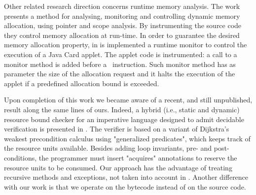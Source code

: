 Other related research direction concerns runtime memory analysis. The work \cite{GNYZ04pir} presents a method for analysing, monitoring and controlling dynamic memory allocation, using pointer and scope analysis. By instrumenting the source code they control memory allocation at run-time. In order to guarantee the desired memory allocation property, in \cite{fredlund04gcp} is implemented a runtime monitor to control the execution of a Java Card applet. The applet code is instrumented: a call to a monitor method is added before a \new\ instruction. Such monitor method has as parameter the size of the allocation request and it halts the execution of the applet if a predefined allocation bound is exceeded. 



Upon completion of this work we became aware of a recent, and still
unpublished, result along the same lines of ours. Indeed,  a hybrid (i.e., static and dynamic)
resource bound checker for an imperative language designed to admit
decidable verification is presented in \cite{CEILN05}. The verifier is based on a variant of Dijkstra's
weakest precondition calculus using "generalized predicates", which keeps
track of the resource units available. Besides adding loop invariants,
pre- and post-conditions, the programmer must insert "acquires"
annotations to reserve the resource units to be consumed. Our approach has
the advantage of treating recursive methods and exceptions, not taken into
account in \cite{CEILN05}. Another difference with our work is that we
operate on the bytecode instead of on the source code.



